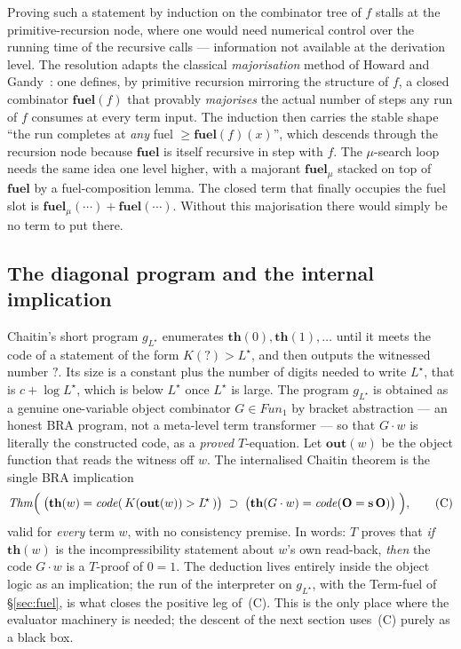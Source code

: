 \documentclass[11pt]{article}
\theoremstyle{plain}
\theoremstyle{definition}
\theoremstyle{remark}
\newcommand{\code}[1]{\mathit{code}(#1)}
\newcommand{\thmT}{\mathbf{th}}
\newcommand{\Kc}{K}
\newcommand{\Fun}{\mathit{Fun}}
\newcommand{\fuelG}{\mathbf{fuel}}
\newcommand{\fuelMu}{\mathbf{fuel}_\mu}
\newcommand{\Lstar}{L^{\!\star}}
\newcommand{\imp}{\supset}
\begin{document}
Proving such a statement by induction on the combinator tree of $f$
stalls at the primitive-recursion node, where one would need numerical
control over the running time of the recursive calls --- information not
available at the derivation level. The resolution adapts the classical
\emph{majorisation} method of Howard and Gandy~\cite{Howard73,Gandy80}:
one defines, by primitive recursion mirroring the structure of $f$, a
closed combinator $\fuelG(f)$ that provably \emph{majorises} the actual
number of steps any run of $f$ consumes at every term input. The
induction then carries the stable shape ``the run completes at
\emph{any} fuel $\ge \fuelG(f)(x)$'', which descends through the
recursion node because $\fuelG$ is itself recursive in step with $f$. The
$\mu$-search loop needs the same idea one level higher, with a majorant
$\fuelMu$ stacked on top of $\fuelG$ by a fuel-composition lemma. The
closed term that finally occupies the fuel slot is
$\fuelMu(\cdots) + \fuelG(\cdots)$. Without this majorisation there would
simply be no term to put there.

\subsection{The diagonal program and the internal implication}

Chaitin's short program $g_{\Lstar}$ enumerates $\thmT(0), \thmT(1),
\dots$ until it meets the code of a statement of the form
$\Kc(?)>\Lstar$, and then outputs the witnessed number $?$. Its size is a
constant plus the number of digits needed to write $\Lstar$, that is
$c + \log\Lstar$, which is below $\Lstar$ once $\Lstar$ is large. The
program $g_{\Lstar}$ is obtained as a genuine one-variable object
combinator $G\in\Fun_1$ by bracket abstraction --- an honest BRA program,
not a meta-level term transformer --- so that $G\cdot w$ is literally the
constructed code, as a \emph{proved} $T$-equation. Let $\mathbf{out}(w)$
be the object function that reads the witness off $w$. The internalised
Chaitin theorem is the single BRA implication
\[
  \mathit{Thm}\Bigl(\;\bigl(\thmT(w) = \code{\,\Kc(\mathbf{out}(w))>\Lstar\,}\bigr)
        \;\imp\;
        \bigl(\thmT(G\cdot w) = \code{\mathbf{O}=\mathbf{s}\,\mathbf{O}}\bigr)\;\Bigr),
  \tag{C}
\]
valid for \emph{every} term $w$, with no consistency premise. In words:
$T$ proves that \emph{if} $\thmT(w)$ is the incompressibility statement
about $w$'s own read-back, \emph{then} the code $G\cdot w$ is a $T$-proof
of $0=1$. The deduction lives entirely inside the object logic as an
implication; the run of the interpreter on $g_{\Lstar}$, with the
Term-fuel of \S\ref{sec:fuel}, is what closes the positive leg of~(C).
This is the only place where the evaluator machinery is needed; the
descent of the next section uses~(C) purely as a black box.
\end{document}

